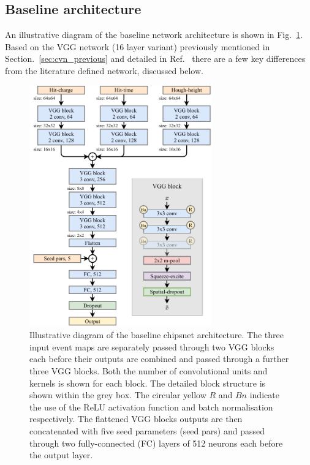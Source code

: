 \subsection{Baseline architecture} %
\label{sec:cvn_baseline_arch} %

An illustrative diagram of the baseline network architecture is shown in Fig.~\ref{fig:chipsnet}.
Based on the VGG network (16 layer variant) previously mentioned in
Section.~\ref{sec:cvn_previous} and detailed in Ref.~\cite{simonyan2014} there are a few key
differences from the literature defined network, discussed below.

\begin{figure} %
    \includegraphics[width=0.7\textwidth]{diagrams/6-cvn/chipsnet.pdf}
    \caption[chipsnet short]
    {Illustrative diagram of the baseline chipsnet architecture. The three input event maps are
        separately passed through two VGG blocks each before their outputs are combined and passed
        through a further three VGG blocks. Both the number of convolutional units and kernels is
        shown for each block. The detailed block structure is shown within the grey box. The
        circular yellow $R$ and $Bn$ indicate the use of the ReLU activation function and batch
        normalisation respectively. The flattened VGG blocks outputs are then concatenated with
        five seed parameters (seed pars) and passed through two fully-connected (FC) layers of 512
        neurons each before the output layer.}
    \label{fig:chipsnet}
\end{figure}

